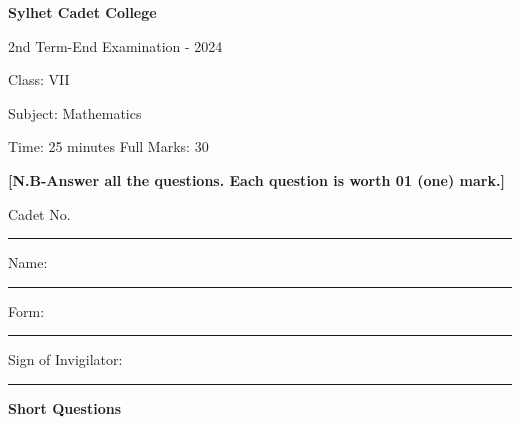 \documentclass{exam}
\begin{document}
\begin{center}
  \bfseries\large
  Sylhet Cadet College

\normalsize
2nd Term-End Examination - 2024

  Class: VII
  
  Subject: Mathematics

  Time: 25 minutes \qquad \qquad  \qquad \qquad \qquad  \qquad \qquad  \qquad Full Marks: 30

\end{center}


 \begin{center} \textbf{[N.B-Answer all the questions. Each question is worth 01 (one) mark.]}\\


\vspace{0.5cm}

Cadet No. \noindent\rule{1cm}{0.4pt} \qquad Name: \noindent\rule{2cm}{0.4pt}  
Form: \noindent\rule{1cm}{0.4pt} Sign of Invigilator: \noindent\rule{2cm}{0.4pt}
 
\end{center}

\textbf{Short Questions}
\end{document}
